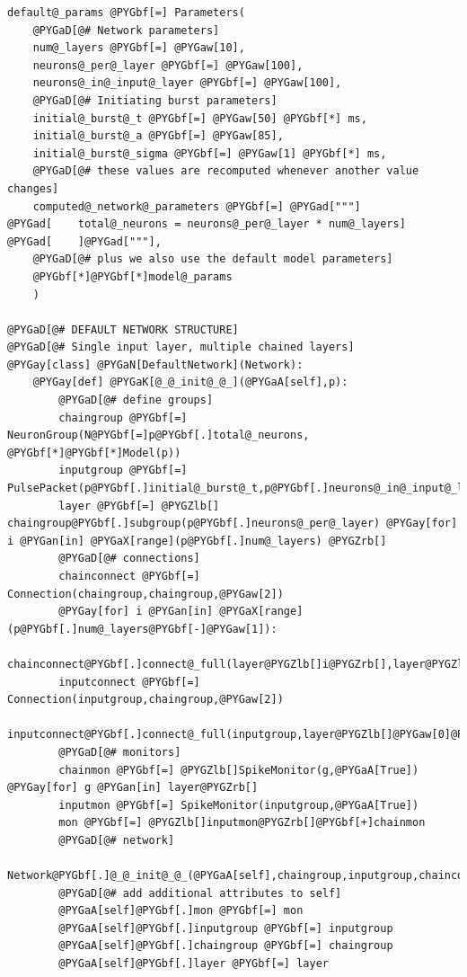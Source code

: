 \documentclass[letterpaper,10pt,english]{manual}
\begin{document}
\begin{Verbatim}[commandchars=@\[\]]
default@_params @PYGbf[=] Parameters(
    @PYGaD[@# Network parameters]
    num@_layers @PYGbf[=] @PYGaw[10],
    neurons@_per@_layer @PYGbf[=] @PYGaw[100],
    neurons@_in@_input@_layer @PYGbf[=] @PYGaw[100],
    @PYGaD[@# Initiating burst parameters]
    initial@_burst@_t @PYGbf[=] @PYGaw[50] @PYGbf[*] ms,
    initial@_burst@_a @PYGbf[=] @PYGaw[85],
    initial@_burst@_sigma @PYGbf[=] @PYGaw[1] @PYGbf[*] ms,
    @PYGaD[@# these values are recomputed whenever another value changes]
    computed@_network@_parameters @PYGbf[=] @PYGad["""]
@PYGad[    total@_neurons = neurons@_per@_layer * num@_layers]
@PYGad[    ]@PYGad["""],
    @PYGaD[@# plus we also use the default model parameters]
    @PYGbf[*]@PYGbf[*]model@_params
    )

@PYGaD[@# DEFAULT NETWORK STRUCTURE]
@PYGaD[@# Single input layer, multiple chained layers]
@PYGay[class] @PYGaN[DefaultNetwork](Network):
    @PYGay[def] @PYGaK[@_@_init@_@_](@PYGaA[self],p):
        @PYGaD[@# define groups]
        chaingroup @PYGbf[=] NeuronGroup(N@PYGbf[=]p@PYGbf[.]total@_neurons, @PYGbf[*]@PYGbf[*]Model(p))
        inputgroup @PYGbf[=] PulsePacket(p@PYGbf[.]initial@_burst@_t,p@PYGbf[.]neurons@_in@_input@_layer,p@PYGbf[.]initial@_burst@_sigma)
        layer @PYGbf[=] @PYGZlb[] chaingroup@PYGbf[.]subgroup(p@PYGbf[.]neurons@_per@_layer) @PYGay[for] i @PYGan[in] @PYGaX[range](p@PYGbf[.]num@_layers) @PYGZrb[]
        @PYGaD[@# connections]
        chainconnect @PYGbf[=] Connection(chaingroup,chaingroup,@PYGaw[2])
        @PYGay[for] i @PYGan[in] @PYGaX[range](p@PYGbf[.]num@_layers@PYGbf[-]@PYGaw[1]):
            chainconnect@PYGbf[.]connect@_full(layer@PYGZlb[]i@PYGZrb[],layer@PYGZlb[]i@PYGbf[+]@PYGaw[1]@PYGZrb[],p@PYGbf[.]psp@_peak@PYGbf[*]p@PYGbf[.]we)
        inputconnect @PYGbf[=] Connection(inputgroup,chaingroup,@PYGaw[2])
        inputconnect@PYGbf[.]connect@_full(inputgroup,layer@PYGZlb[]@PYGaw[0]@PYGZrb[],p@PYGbf[.]psp@_peak@PYGbf[*]p@PYGbf[.]we)
        @PYGaD[@# monitors]
        chainmon @PYGbf[=] @PYGZlb[]SpikeMonitor(g,@PYGaA[True]) @PYGay[for] g @PYGan[in] layer@PYGZrb[]
        inputmon @PYGbf[=] SpikeMonitor(inputgroup,@PYGaA[True])
        mon @PYGbf[=] @PYGZlb[]inputmon@PYGZrb[]@PYGbf[+]chainmon
        @PYGaD[@# network]
        Network@PYGbf[.]@_@_init@_@_(@PYGaA[self],chaingroup,inputgroup,chainconnect,inputconnect,mon)
        @PYGaD[@# add additional attributes to self]
        @PYGaA[self]@PYGbf[.]mon @PYGbf[=] mon
        @PYGaA[self]@PYGbf[.]inputgroup @PYGbf[=] inputgroup
        @PYGaA[self]@PYGbf[.]chaingroup @PYGbf[=] chaingroup
        @PYGaA[self]@PYGbf[.]layer @PYGbf[=] layer

\end{Verbatim}
\end{document}
